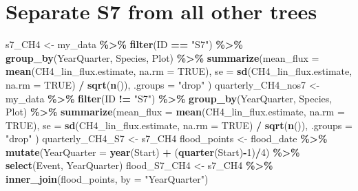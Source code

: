 \documentclass[
]{article}
\newenvironment{Shaded}{\begin{snugshade}}{\end{snugshade}}
\newcommand{\AttributeTok}[1]{\textcolor[rgb]{0.13,0.29,0.53}{#1}}
\newcommand{\ConstantTok}[1]{\textcolor[rgb]{0.56,0.35,0.01}{#1}}
\newcommand{\DecValTok}[1]{\textcolor[rgb]{0.00,0.00,0.81}{#1}}
\newcommand{\FunctionTok}[1]{\textcolor[rgb]{0.13,0.29,0.53}{\textbf{#1}}}
\newcommand{\NormalTok}[1]{#1}
\newcommand{\OtherTok}[1]{\textcolor[rgb]{0.56,0.35,0.01}{#1}}
\newcommand{\SpecialCharTok}[1]{\textcolor[rgb]{0.81,0.36,0.00}{\textbf{#1}}}
\newcommand{\StringTok}[1]{\textcolor[rgb]{0.31,0.60,0.02}{#1}}
\begin{document}
\section{Separate S7 from all other
trees}\label{separate-s7-from-all-other-trees}

\begin{Shaded}
\begin{Highlighting}[]
\NormalTok{s7\_CH4 }\OtherTok{\textless{}{-}}\NormalTok{ my\_data }\SpecialCharTok{\%\textgreater{}\%}
  \FunctionTok{filter}\NormalTok{(ID }\SpecialCharTok{==} \StringTok{"S7"}\NormalTok{) }\SpecialCharTok{\%\textgreater{}\%}
  \FunctionTok{group\_by}\NormalTok{(YearQuarter, Species, Plot) }\SpecialCharTok{\%\textgreater{}\%}
  \FunctionTok{summarize}\NormalTok{(}\AttributeTok{mean\_flux =} \FunctionTok{mean}\NormalTok{(CH4\_lin\_flux.estimate, }\AttributeTok{na.rm =} \ConstantTok{TRUE}\NormalTok{),}
            \AttributeTok{se =} \FunctionTok{sd}\NormalTok{(CH4\_lin\_flux.estimate, }\AttributeTok{na.rm =} \ConstantTok{TRUE}\NormalTok{) }\SpecialCharTok{/} \FunctionTok{sqrt}\NormalTok{(}\FunctionTok{n}\NormalTok{()), }\AttributeTok{.groups =} \StringTok{"drop"}\NormalTok{  )}
\NormalTok{quarterly\_CH4\_nos7 }\OtherTok{\textless{}{-}}\NormalTok{ my\_data }\SpecialCharTok{\%\textgreater{}\%}
  \FunctionTok{filter}\NormalTok{(ID }\SpecialCharTok{!=} \StringTok{"S7"}\NormalTok{) }\SpecialCharTok{\%\textgreater{}\%}
  \FunctionTok{group\_by}\NormalTok{(YearQuarter, Species, Plot) }\SpecialCharTok{\%\textgreater{}\%}
  \FunctionTok{summarize}\NormalTok{(}\AttributeTok{mean\_flux =} \FunctionTok{mean}\NormalTok{(CH4\_lin\_flux.estimate, }\AttributeTok{na.rm =} \ConstantTok{TRUE}\NormalTok{),}
            \AttributeTok{se =} \FunctionTok{sd}\NormalTok{(CH4\_lin\_flux.estimate, }\AttributeTok{na.rm =} \ConstantTok{TRUE}\NormalTok{) }\SpecialCharTok{/} \FunctionTok{sqrt}\NormalTok{(}\FunctionTok{n}\NormalTok{()), }\AttributeTok{.groups =} \StringTok{"drop"}\NormalTok{ )}
\NormalTok{quarterly\_CH4\_S7 }\OtherTok{\textless{}{-}}\NormalTok{ s7\_CH4}
\NormalTok{flood\_points }\OtherTok{\textless{}{-}}\NormalTok{ flood\_date }\SpecialCharTok{\%\textgreater{}\%}
  \FunctionTok{mutate}\NormalTok{(}\AttributeTok{YearQuarter =} \FunctionTok{year}\NormalTok{(Start) }\SpecialCharTok{+}\NormalTok{ (}\FunctionTok{quarter}\NormalTok{(Start)}\SpecialCharTok{{-}}\DecValTok{1}\NormalTok{)}\SpecialCharTok{/}\DecValTok{4}\NormalTok{) }\SpecialCharTok{\%\textgreater{}\%}
  \FunctionTok{select}\NormalTok{(Event, YearQuarter)}
\NormalTok{flood\_S7\_CH4 }\OtherTok{\textless{}{-}}\NormalTok{ s7\_CH4 }\SpecialCharTok{\%\textgreater{}\%}
  \FunctionTok{inner\_join}\NormalTok{(flood\_points, }\AttributeTok{by =} \StringTok{"YearQuarter"}\NormalTok{)}
\end{Highlighting}
\end{Shaded}
\end{document}
